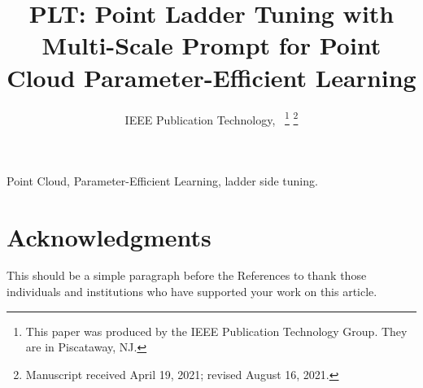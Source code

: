 \documentclass[lettersize,journal]{IEEEtran}
\begin{document}
\title{PLT: Point Ladder Tuning with Multi-Scale Prompt for Point Cloud
Parameter-Efficient Learning}

\author{IEEE Publication Technology,~
\thanks{This paper was produced by the IEEE Publication Technology Group. They are in Piscataway, NJ.}%
\thanks{Manuscript received April 19, 2021; revised August 16, 2021.}}



\maketitle



\begin{IEEEkeywords}
Point Cloud, Parameter-Efficient Learning, ladder side tuning.
\end{IEEEkeywords}








\section*{Acknowledgments}
This should be a simple paragraph before the References to thank those individuals and institutions who have supported your work on this article.



\end{document}
